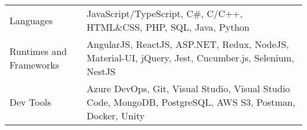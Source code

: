 

\vspace{2mm}\fontsize{1}{15}
\begin{justify}
	\begin{tabularx}{\linewidth}{
			>{\hsize=0.6\hsize}X%
			>{\hsize=1.4\hsize}X%
		}
		Languages	 				& JavaScript/TypeScript, C\#, C/C++, HTML\&CSS, PHP, SQL, Java, Python \\
		Runtimes and Frameworks		& AngularJS, ReactJS, ASP.NET, Redux, NodeJS, Material-UI, jQuery, Jest, Cucumber.js, Selenium, NestJS\\
		Dev Tools					& Azure DevOps, Git, Visual Studio, Visual Studio Code, MongoDB, PostgreSQL, AWS S3, Postman, Docker, Unity
	\end{tabularx}
\end{justify}